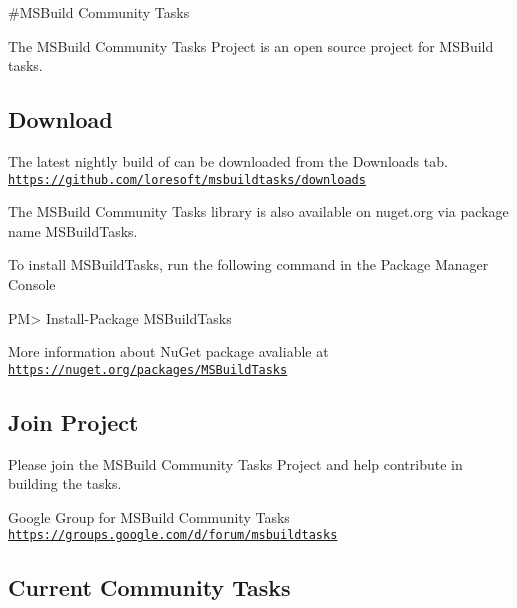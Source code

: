 \#\-M\-S\-Build Community Tasks

The M\-S\-Build Community Tasks Project is an open source project for M\-S\-Build tasks.

\subsection*{Download}

The latest nightly build of can be downloaded from the Downloads tab. \href{https://github.com/loresoft/msbuildtasks/downloads}{\tt https\-://github.\-com/loresoft/msbuildtasks/downloads}

The M\-S\-Build Community Tasks library is also available on nuget.\-org via package name {\ttfamily M\-S\-Build\-Tasks}.

To install M\-S\-Build\-Tasks, run the following command in the Package Manager Console \begin{DoxyVerb}PM> Install-Package MSBuildTasks
\end{DoxyVerb}


More information about Nu\-Get package avaliable at \href{https://nuget.org/packages/MSBuildTasks}{\tt https\-://nuget.\-org/packages/\-M\-S\-Build\-Tasks}

\subsection*{Join Project}

Please join the M\-S\-Build Community Tasks Project and help contribute in building the tasks.

Google Group for M\-S\-Build Community Tasks \href{https://groups.google.com/d/forum/msbuildtasks}{\tt https\-://groups.\-google.\-com/d/forum/msbuildtasks}

\subsection*{Current Community Tasks}

